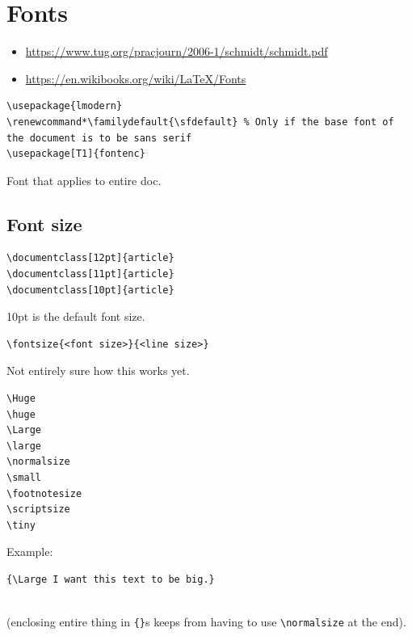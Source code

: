 \documentclass{article}
\begin{document}
\section{Fonts}
\begin{itemize}
    \item \url{https://www.tug.org/pracjourn/2006-1/schmidt/schmidt.pdf}
    \item \url{https://en.wikibooks.org/wiki/LaTeX/Fonts}
\end{itemize}

\begin{minipage}[t]{0.5\textwidth}
    \begin{verbatim}
\usepackage{lmodern}
\renewcommand*\familydefault{\sfdefault} % Only if the base font of the document is to be sans serif
\usepackage[T1]{fontenc}
    \end{verbatim}
\end{minipage}
\begin{minipage}[t]{0.5\textwidth}
    Font that applies to entire doc.
\end{minipage}

\subsection{Font size}
\begin{minipage}[t]{0.5\textwidth}
\begin{verbatim}
\documentclass[12pt]{article}
\documentclass[11pt]{article}
\documentclass[10pt]{article}
\end{verbatim}
\end{minipage}
\begin{minipage}[t]{0.5\textwidth}
10pt is the default font size.
\end{minipage}

\begin{minipage}[t]{0.5\textwidth}
\begin{verbatim}
\fontsize{<font size>}{<line size>}
\end{verbatim}
\end{minipage}
\begin{minipage}[t]{0.5\textwidth}
    Not entirely sure how this works yet.
\end{minipage}

\begin{minipage}[t]{0.5\textwidth}
\begin{verbatim}
\Huge
\huge
\Large
\large
\normalsize
\small
\footnotesize
\scriptsize
\tiny
\end{verbatim}
\end{minipage}
\begin{minipage}[t]{0.5\textwidth}
    Example:
\begin{verbatim}
{\Large I want this text to be big.}
\end{verbatim}
    \vspace{-2ex}{\Large I want this text to be big.}\\
(enclosing entire thing in \verb|{}|s keeps from having to use
\verb|\normalsize| at the end).
\end{minipage}
\end{document}
